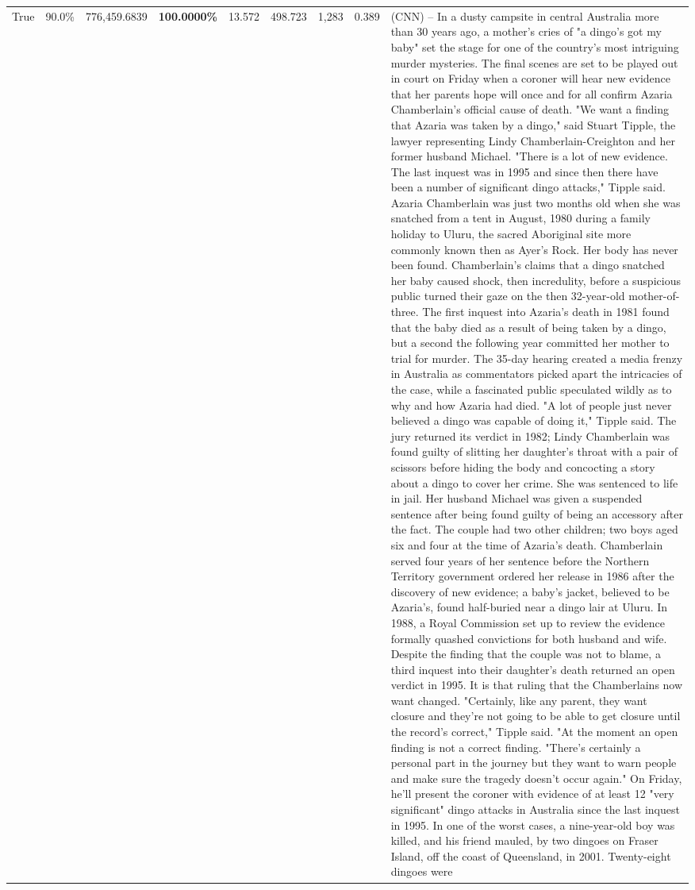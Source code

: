 \begin{table}[H]
\begin{tabular}{lllrlllll}
True & 90.0\% & 776,459.6839 & \bfseries \color{red} 100.0000\% & 13.572 & 498.723 & 1,283 & 0.389 & (CNN) -- In a dusty campsite in central Australia more than 30 years ago, a mother's cries of "a dingo's got my baby" set the stage for one of the country's most intriguing murder mysteries. The final scenes are set to be played out in court on Friday when a coroner will hear new evidence that her parents hope will once and for all confirm Azaria Chamberlain's official cause of death. "We want a finding that Azaria was taken by a dingo," said Stuart Tipple, the lawyer representing Lindy Chamberlain-Creighton and her former husband Michael. "There is a lot of new evidence. The last inquest was in 1995 and since then there have been a number of significant dingo attacks," Tipple said. Azaria Chamberlain was just two months old when she was snatched from a tent in August, 1980 during a family holiday to Uluru, the sacred Aboriginal site more commonly known then as Ayer's Rock. Her body has never been found. Chamberlain's claims that a dingo snatched her baby caused shock, then incredulity, before a suspicious public turned their gaze on the then 32-year-old mother-of-three. The first inquest into Azaria's death in 1981 found that the baby died as a result of being taken by a dingo, but a second the following year committed her mother to trial for murder. The 35-day hearing created a media frenzy in Australia as commentators picked apart the intricacies of the case, while a fascinated public speculated wildly as to why and how Azaria had died. "A lot of people just never believed a dingo was capable of doing it," Tipple said. The jury returned its verdict in 1982; Lindy Chamberlain was found guilty of slitting her daughter's throat with a pair of scissors before hiding the body and concocting a story about a dingo to cover her crime. She was sentenced to life in jail. Her husband Michael was given a suspended sentence after being found guilty of being an accessory after the fact. The couple had two other children; two boys aged six and four at the time of Azaria's death. Chamberlain served four years of her sentence before the Northern Territory government ordered her release in 1986 after the discovery of new evidence; a baby's jacket, believed to be Azaria's, found half-buried near a dingo lair at Uluru. In 1988, a Royal Commission set up to review the evidence formally quashed convictions for both husband and wife. Despite the finding that the couple was not to blame, a third inquest into their daughter's death returned an open verdict in 1995. It is that ruling that the Chamberlains now want changed. "Certainly, like any parent, they want closure and they're not going to be able to get closure until the record's correct," Tipple said. "At the moment an open finding is not a correct finding. "There's certainly a personal part in the journey but they want to warn people and make sure the tragedy doesn't occur again." On Friday, he'll present the coroner with evidence of at least 12 "very significant" dingo attacks in Australia since the last inquest in 1995. In one of the worst cases, a nine-year-old boy was killed, and his friend mauled, by two dingoes on Fraser Island, off the coast of Queensland, in 2001. Twenty-eight dingoes were 
\end{tabular}
\end{table}
